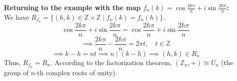 \vspace{1em}
\textbf{Returning to the example with the map $f_n(k) = \cos \frac{2k\pi}{n} + i \sin \frac{2k\pi}{n}$:} \\
We have $R_{f_n} = \{(h,k) \in \mathbb{Z} \times \mathbb{Z} \mid f_n(k) = f_n(h)\}$.
$$ \cos \frac{2k\pi}{n} + i \sin \frac{2k\pi}{n} = \cos \frac{2h\pi}{n} + i \sin \frac{2h\pi}{n} $$
$$ \implies \frac{2k\pi}{n} - \frac{2h\pi}{n} = 2\pi t, \quad t \in \mathbb{Z} $$
$$ \implies k - h = nt \implies n \mid (k - h) \implies (h,k) \in R_n $$
Thus, $R_{f_n} = R_n$. According to the factorization theorem, $(\mathbb{Z}_n, +) \cong U_n$ (the group of $n$-th complex roots of unity).